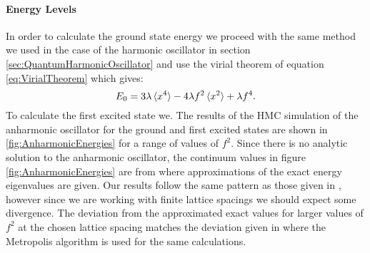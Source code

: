 \documentclass[12pt]{article}
\begin{document}
            \paragraph{Energy Levels}
                In order to calculate the ground state energy we proceed with the same method we used in the case of the harmonic oscillator in section \ref{sec:QuantumHarmonicOscillator} and use the virial theorem of equation \ref{eq:VirialTheorem} which gives:
                \begin{equation}
                    \label{eq:VirialTheoremAnharmonicOsillator}
                    E_0=3\lambda\braket{x^4}-4\lambda f^2\braket{x^2}+\lambda f^4.
                \end{equation}
                To calculate the first excited state we. The results of the HMC simulation of the anharmonic oscillator for the ground and first excited states are shown in \ref{fig:AnharmonicEnergies} for a range of values of $f^2$. Since there is no analytic solution to the anharmonic oscillator, the continuum values in figure \ref{fig:AnharmonicEnergies} are from \cite{blankenbecler_degrand_sugar_1980} where approximations of the exact energy eigenvalues are given. Our results follow the same pattern as those given in \cite{blankenbecler_degrand_sugar_1980}, however since we are working with finite lattice spacings we should expect some divergence. The deviation from the approximated exact values for larger values of $f^2$ at the chosen lattice spacing matches the deviation given in \cite{rodgers_raes} where the Metropolis algorithm is used for the same calculations.
\end{document}
